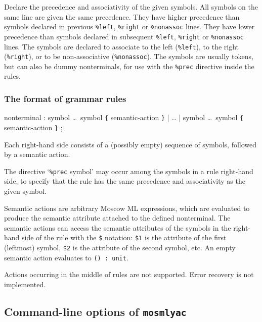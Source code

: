 \documentclass[fleqn]{article}
\begin{document}
\begin{description}
  Declare the precedence and associativity of the given symbols.  All
  symbols on the same line are given the same precedence.  They have
  higher precedence than symbols declared in previous {\tt \%left},
  {\tt \%right} or {\tt \%nonassoc} lines.  They have lower precedence
  than symbols declared in subsequent {\tt \%left}, {\tt \%right} or
  {\tt \%nonassoc} lines.  The symbols are declared to associate to
  the left ({\tt \%left}), to the right ({\tt \%right}), or to be
  non-associative ({\tt \%nonassoc}).  The symbols are usually tokens,
  but can also be dummy nonterminals, for use with the {\tt \%prec}
  directive inside the rules.
\end{description}


\subsubsection{The format of grammar rules}

\begin{program}
{\rm nonterminal} :
    {\rm symbol \ldots\ symbol} \verb#{# {\rm semantic-action} \verb#}#
  | \ldots
  | {\rm symbol \ldots\ symbol} \verb#{# {\rm semantic-action} \verb#}#
;
\end{program}

\noindent Each right-hand side consists of a (possibly empty) sequence
of symbols, followed by a semantic action.  

The directive `{\tt \%prec} symbol' may occur among the symbols in a
rule right-hand side, to specify that the rule has the same precedence
and associativity as the given symbol.

Semantic actions are arbitrary Moscow ML expressions, which are
evaluated to produce the semantic attribute attached to the defined
nonterminal.  The semantic actions can access the semantic attributes
of the symbols in the right-hand side of the rule with the \verb#$#
notation: \verb#$1# is the attribute of the first (leftmost) symbol,
\verb#$2# is the attribute of the second symbol, etc.  An empty
semantic action evaluates to {\tt () :\ unit}.

Actions occurring in the middle of rules are not supported.  Error
recovery is not implemented.


\subsection{Command-line options of {\tt mosmlyac}}
\label{sec-mosmlyac-options}
\end{document}
